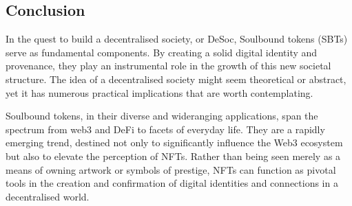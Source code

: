 \documentclass[letterpaper,10pt,english]{jupyterBook}
\begin{document}
\subsection{Conclusion}
\label{\detokenize{SBT/SBT:conclusion}}
\sphinxAtStartPar
In the quest to build a decentralised society, or DeSoc, Soulbound tokens (SBTs) serve as fundamental components. By creating a solid digital identity and provenance, they play an instrumental role in the growth of this new societal structure. The idea of a decentralised society might seem theoretical or abstract, yet it has numerous practical implications that are worth contemplating.

\sphinxAtStartPar
Soulbound tokens, in their diverse and wide\sphinxhyphen{}ranging applications, span the spectrum from web3 and DeFi to facets of everyday life. They are a rapidly emerging trend, destined not only to significantly influence the Web3 ecosystem but also to elevate the perception of NFTs. Rather than being seen merely as a means of owning artwork or symbols of prestige, NFTs can function as pivotal tools in the creation and confirmation of digital identities and connections in a decentralised world.
\end{document}
